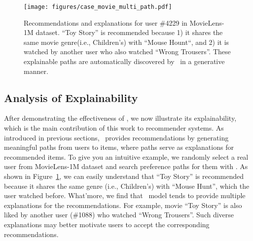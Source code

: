 \begin{figure}[t]
    \centering
    \texttt{[image: figures/case\_movie\_multi\_path.pdf]}
\caption{Recommendations and explanations for user \#4229 in MovieLens-1M dataset. ``Toy Story'' is recommended because 1) it shares the same movie genre(i.e., Children's) with ``Mouse Hount``, and 2) it is watched by another user who also watched ``Wrong Trousers''. These explainable paths are automatically discovered by \name\ in a generative manner. 
    }
    \label{fig::case}
\end{figure}


\subsection{Analysis of Explainability}
After demonstrating the effectiveness of \name, we now illustrate its explainability, which is the main contribution of this work to recommender systems. As introduced in previous sections, \name\ provides recommendations by generating meaningful paths from users to items, where paths serve as explanations for recommended items. To give you an intuitive example, we randomly select a real user from MovieLens-1M dataset and search preference paths for them with \name.
As shown in Figure~\ref{fig::case}, we can easily understand that ``Toy Story'' is recommended because it shares the same genre (i.e., Children's) with ``Mouse Hunt'', which the user watched before.
What'more, we find that \name\ model tends to provide multiple explanations for the recommendations. For example, movie ``Toy Story'' is also liked by another user (\#1088) who watched ``Wrong Trousers''. Such diverse explanations may better motivate users to accept the corresponding recommendations. 

